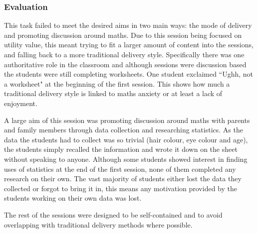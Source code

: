 \documentclass[11pt, a4paper, notitlepage]{article}
\begin{document}
\subsubsection*{Evaluation}
This task failed to meet the desired aims in two main ways: the mode of delivery and promoting discussion around maths. Due to this session being focused on utility value, this meant trying to fit a larger amount of content into the sessions, and falling back to a more traditional delivery style. Specifically there was one authoritative role in the classroom and although sessions were discussion based the students were still completing worksheets. One student exclaimed ``Ughh, not a worksheet" at the beginning of the first session. This shows how much a traditional delivery style is linked to maths anxiety or at least a lack of enjoyment.
\par
A large aim of this session was promoting discussion around maths with parents and family members through data collection and researching statistics. As the data the students had to collect was so trivial (hair colour, eye colour and age), the students simply recalled the information and wrote it down on the sheet without speaking to anyone. Although some students showed interest in finding uses of statistics at the end of the first session, none of them completed any research on their own. The vast majority of students either lost the data they collected or forgot to bring it in, this means any motivation provided by the students working on their own data was lost.
\par
The rest of the sessions were designed to be self-contained and to avoid overlapping with traditional delivery methods where possible.
\end{document}
